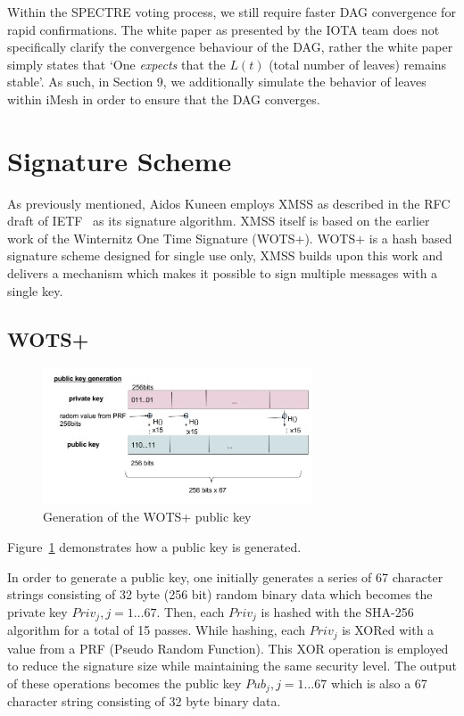 \documentclass[a4paper,10pt,twocolumn]{article}
\begin{document}
Within the SPECTRE voting process, we still require faster DAG convergence for rapid confirmations. The white paper as presented by the 
IOTA team does not specifically clarify the convergence behaviour of the DAG, rather the white paper simply states that `One 
\emph{expects} that the \( L(t) \) (total number of leaves) remains stable'. As such, in Section 9, we additionally simulate the behavior of leaves within iMesh in order to ensure that the DAG converges.

\section{Signature Scheme}
\label{sec:sig}

As previously mentioned, Aidos Kuneen employs XMSS as described in the RFC draft of IETF~\cite{ietf} as its signature algorithm. XMSS 
itself is based on the earlier work of the Winternitz One Time Signature (WOTS+). WOTS+ is a hash based signature scheme designed for 
single use only, XMSS builds upon this work and delivers a mechanism which makes it possible to sign multiple messages with a single 
key.

\subsection{WOTS+}

\begin{figure}[ht]
	\begin{center}
	\includegraphics[width=80mm]{wots_pub.png}
	  \caption{Generation of the WOTS+ public key}
    \label{fig:wots_pub}
	\end{center}
 \end{figure}

 Figure~\ref{fig:wots_pub} demonstrates how a public key is generated.

 In order to generate a public key, one initially generates a series of 67 character strings consisting of 32 byte (256 bit) random binary data which becomes the 
 private key \( Priv_{j}, j=1 \ldots 67\). Then, each \( Priv_{j} \) is hashed with the SHA-256 algorithm for a total of 15 passes. 
 While hashing, each \( Priv_{j} \) is XORed with a value from a PRF (Pseudo Random Function). This XOR operation is employed to reduce 
 the signature size while maintaining the same security level. The output of these operations becomes the public 
 key \( Pub_{j}, j=1 \ldots 67\) which is also a 67 character string consisting of 32 byte binary data.
\end{document}
